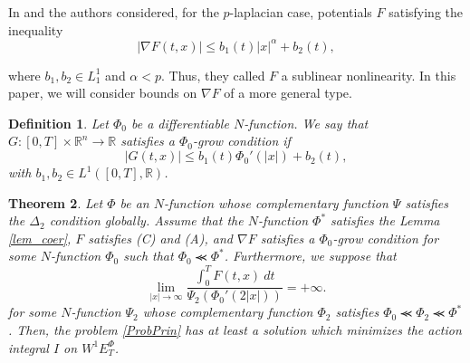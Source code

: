 \documentclass[twoside]{article}
\newtheorem{thm}{Theorem}[section]
\newtheorem{defi}[thm]{Definition}
\theoremstyle{remark}
\newcommand{\ephi}{E^{\Phi}}
\newcommand{\wphie}{W^{1}\ephi}
\newcommand{\rr}{\mathbb{R}}
\renewcommand{\leq}{\leqslant}
\begin{document}
In \cite{tang1998periodic} and \cite{tang2010periodic} the authors  considered, for the $p$-laplacian case, potentials $F$ satisfying the inequality
\begin{equation}\label{eq:cota_pot} |\nabla F(t,x)|\leq b_1(t)|x|^{\alpha}+b_2(t),
 \end{equation}


where  $b_1,b_2 \in L^1_1$ and $\alpha<p$. Thus, they called $F$  a sublinear nonlinearity. 
In this paper, we will consider bounds on $\nabla F$ of a more general type.

\begin{defi} Let $\Phi_0$ be a differentiable $N$-function. We say that $G:[0,T]\times\rr^n\to\rr$  satisfies a $\Phi_0$-\emph{grow condition} if
\begin{equation}\label{holder_cont-mu}
  \left| G(t,x) \right|\leq b_1(t)\Phi_0'(|x|)+b_2(t),
\end{equation}
with $b_1,b_2 \in L^1([0,T],\rr)$.

\end{defi}



\begin{thm}\label{coercitividad-r} Let $\Phi$ be an $N$-function whose complementary function $\Psi$ satisfies the $\Delta_2$ condition globally. 
Assume that the $N$-function $\Phi^*$ satisfies the Lemma \ref{lem_coer}, $F$ satisfies (C) and
(A), and  $\nabla F$ satisfies a $\Phi_0$-grow condition for some 
 $N$-function  $\Phi_0$ such that $\Phi_0\llcurly\Phi^*$.
Furthermore, we suppose that
\begin{equation}\label{eq:propiedad-coercividad-phi0}
\lim_{|x|\to\infty}\frac{\int_{0}^{T}F(t,x)\ dt}{\Psi_2(\Phi_0'(2|x|))}=+\infty.
\end{equation}
for some $N$-function $\Psi_2$ whose complementary function $\Phi_2$ satisfies $\Phi_0\llcurly \Phi_2\llcurly \Phi^*$.
Then,  the problem \eqref{ProbPrin} has at least a solution which minimizes the action integral $I$ on $\wphie_T$.
\end{thm}
\end{document}
